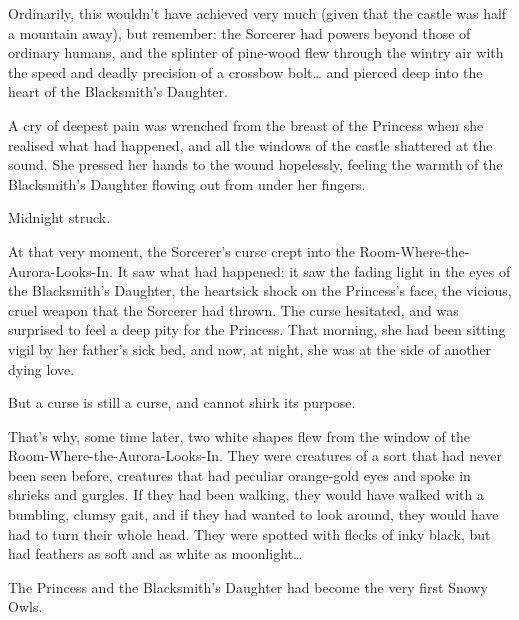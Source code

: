 Ordinarily, this wouldn't have achieved very much (given that the castle was half a mountain away), but remember: the Sorcerer had powers beyond those of ordinary humans, and the splinter of pine-wood flew through the wintry air with the speed and deadly precision of a crossbow bolt… and pierced deep into the heart of the Blacksmith's Daughter. 
 
A cry of deepest pain was wrenched from the breast of the Princess when she realised what had happened, and all the windows of the castle shattered at the sound. She pressed her hands to the wound hopelessly, feeling the warmth of the Blacksmith’s Daughter flowing out from under her fingers. 

Midnight struck. 

At that very moment, the Sorcerer’s curse crept into the Room-Where-the-Aurora-Looks-In. It saw what had happened: it saw the fading light in the eyes of the Blacksmith’s Daughter, the heartsick shock on the Princess’s face, the vicious, cruel weapon that the Sorcerer had thrown. The curse hesitated, and was surprised to feel a deep pity for the Princess. That morning, she had been sitting vigil by her father’s sick bed, and now, at night, she was at the side of another dying love. 

But a curse is still a curse, and cannot shirk its purpose. 

That’s why, some time later, two white shapes flew from the window of the Room-Where-the-Aurora-Looks-In. They were creatures of a sort that had never been seen before, creatures that had peculiar orange-gold eyes and spoke in shrieks and gurgles. If they had been walking, they would have walked with a bumbling, clumsy gait, and if they had wanted to look around, they would have had to turn their whole head. They were spotted with flecks of inky black, but had feathers as soft and as white as moonlight… 

The Princess and the Blacksmith’s Daughter had become the very first Snowy Owls.
